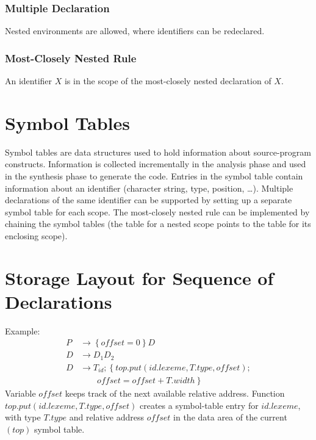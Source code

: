 \subsubsection{Multiple Declaration}
Nested environments are allowed, where identifiers can be redeclared.
\subsubsection{Most-Closely Nested Rule}
An identifier $X$ is in the scope of the most-closely nested declaration of $X$.

\section{Symbol Tables}
Symbol tables are data structures used to hold information about source-program constructs.
Information is collected incrementally in the analysis phase and used in the synthesis phase to generate the code.
Entries in the symbol table contain information about an identifier (character string, type, position, \ldots).
Multiple declarations of the same identifier can be supported by setting up a separate symbol table for each scope.
The most-closely nested rule can be implemented by chaining the symbol tables (the table for a nested scope points to the table for its enclosing scope).

\section{Storage Layout for Sequence of Declarations}
Example:
\begin{align*}
	P &\to \left\{offset = 0\right\}D \\
	D &\to D_1D_2 \\
	D &\to T_{id}; \left\{top.put(id.lexeme, T.type, offset); \right. \\
		&\qquad \left. offset = offset + T.width\right\}
\end{align*}
Variable $offset$ keeps track of the next available relative address.
Function $top.put(id.lexeme, T.type, offset)$ creates a symbol-table entry for $id.lexeme$, with type $T.type$ and relative address $offset$ in the data area of the current $(top)$ symbol table.

